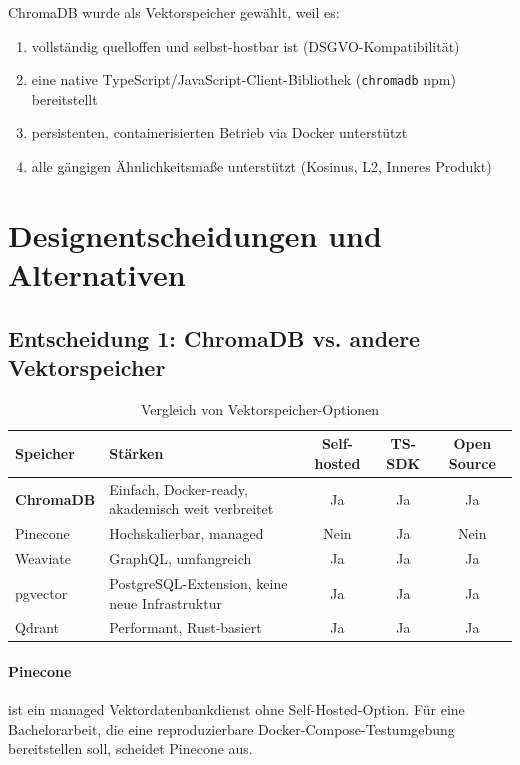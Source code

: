 \documentclass[12pt,a4paper,oneside]{report}
\begin{document}
ChromaDB wurde als Vektorspeicher gewählt, weil es:
\begin{enumerate}
  \item vollständig quelloffen und selbst-hostbar ist (DSGVO-Kompatibilität)
  \item eine native TypeScript/JavaScript-Client-Bibliothek (\texttt{chromadb} npm)
    bereitstellt
  \item persistenten, containerisierten Betrieb via Docker unterstützt
  \item alle gängigen Ähnlichkeitsmaße unterstützt (Kosinus, L2, Inneres Produkt)
\end{enumerate}

\section{Designentscheidungen und Alternativen}

\subsection{Entscheidung 1: ChromaDB vs. andere Vektorspeicher}

\begin{table}[H]
  \centering
  \caption{Vergleich von Vektorspeicher-Optionen}
  \label{tab:vectordb-vergleich}
  \begin{tabularx}{\textwidth}{lXccc}
    \toprule
    \textbf{Speicher} & \textbf{Stärken} & \textbf{Self-hosted} & \textbf{TS-SDK} & \textbf{Open Source} \\
    \midrule
    \textbf{ChromaDB}  & Einfach, Docker-ready, akademisch weit verbreitet & Ja & Ja & Ja \\
    Pinecone           & Hochskalierbar, managed                           & Nein & Ja & Nein \\
    Weaviate           & GraphQL, umfangreich                              & Ja & Ja & Ja \\
    pgvector           & PostgreSQL-Extension, keine neue Infrastruktur     & Ja & Ja & Ja \\
    Qdrant             & Performant, Rust-basiert                          & Ja & Ja & Ja \\
    \bottomrule
  \end{tabularx}
\end{table}

\paragraph{Pinecone} ist ein managed Vektordatenbankdienst ohne Self-Hosted-Option.
Für eine Bachelorarbeit, die eine reproduzierbare Docker-Compose-Testumgebung
bereitstellen soll, scheidet Pinecone aus.
\end{document}
